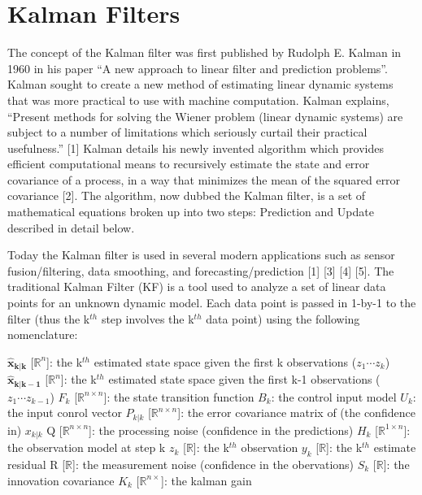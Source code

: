 \section{Kalman Filters}

The concept of the Kalman filter was first published by Rudolph E. Kalman in 1960 in his paper ``A new approach to linear filter and prediction problems''. Kalman sought to create a new method of estimating linear dynamic systems that was more practical to use with machine computation. Kalman explains, ``Present methods for solving the Wiener problem (linear dynamic systems) are subject to a number of limitations which seriously curtail their practical usefulness.'' [1] Kalman details his newly invented algorithm which provides efficient computational means to recursively estimate the state and error covariance of a process, in a way that minimizes the mean of the squared error covariance [2]. The algorithm, now dubbed the Kalman filter, is a set of mathematical equations broken up into two steps: Prediction and Update described in detail below.

Today the Kalman filter is used in several modern applications such as sensor fusion/filtering, data smoothing, and forecasting/prediction [1] [3] [4] [5]. The traditional Kalman Filter (KF) is a tool used to analyze a set of linear data points for an unknown dynamic model. Each data point is passed in 1-by-1 to the filter (thus the k$^{th}$ step involves the k$^{th}$ data point) using the following nomenclature:\newline

$\bm{\hat{x}_{k|k}}$ [$\mathbb{R}^{n}$]:    the k$^{th}$ estimated state space given the first k observations ($z_{1} \cdots z_{k}$)\newline
$\bm{\hat{x}_{k|k-1}}$ [$\mathbb{R}^{n}$]:  the k$^{th}$ estimated state space given the first k-1 observations ($z_{1} \cdots z_{k-1}$)\newline
$F_{k}$ [$\mathbb{R}^{n\times n}$]:  the state transition function\newline
$B_{k}$:   the control input model \newline
$U_{k}$:   the input conrol vector\newline
$P_{k|k}$ [$\mathbb{R}^{n\times n}$]:  the error covariance matrix of (the confidence in) $x_{k|k}$\newline
Q [$\mathbb{R}^{n\times n}$]:    the processing noise (confidence in the predictions)\newline
$H_{k}$ [$\mathbb{R}^{1\times n}$]: the observation model at step k\newline
$z_{k}$ [$\mathbb{R}$]: the k$^{th}$ observation\newline
$y_{k}$ [$\mathbb{R}$]: the k$^{th}$ estimate residual\newline
R [$\mathbb{R}$]: the measurement noise (confidence in the obervations)\newline
$S_{k}$ [$\mathbb{R}$]: the innovation covariance\newline
$K_{k}$ [$\mathbb{R}^{n\times}$]: the kalman gain\newline

